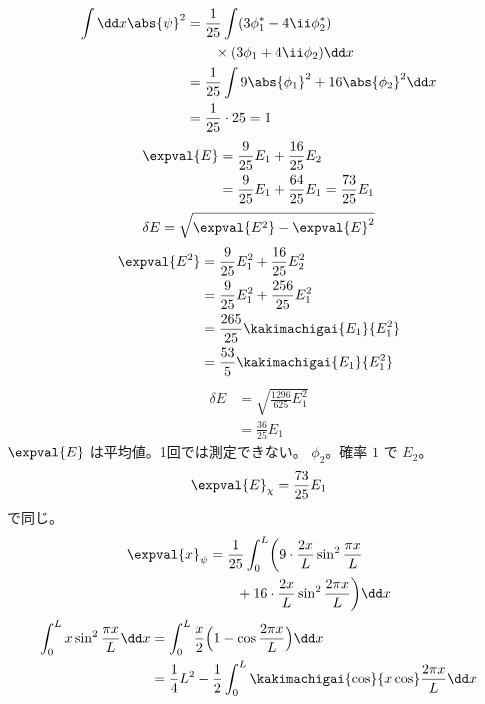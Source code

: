 \begin{align*}
\int\dd x\abs{\psi}^{2}&=\frac{1}{25}\int(3\phi_{1}^{*}-4\ii\phi_{2}^{*})\\
&\qquad\times(3\phi_{1}+4\ii\phi_{2})\dd x\\
&=\frac{1}{25}\int 9\abs{\phi_{1}}^{2}+16\abs{\phi_{2}}^{2}\dd x\\
&=\frac{1}{25}\cdot 25=1
\end{align*}
\begin{align*}
\expval{E}&=\frac{9}{25}E_{1}+\frac{16}{25}E_{2}\\
&=\frac{9}{25}E_{1}+\frac{64}{25}E_{1}=\frac{73}{25}E_{1}
\end{align*}
\[ \delta E=\sqrt{\expval{E^{2}}-\expval{E}^{2}} \]
\begin{align*}
\expval{E^{2}}&=\frac{9}{25}E_{1}^{2}+\frac{16}{25}E_{2}^{2}\\
&=\frac{9}{25}E_{1}^{2}+\frac{256}{25}E_{1}^{2}\\
&=\frac{265}{25}\kakimachigai{E_{1}}{E_{1}^{2}}\\
&=\frac{53}{5}\kakimachigai{E_{1}}{E_{1}^{2}}
\end{align*}
\begin{align*}
\delta E&=\sqrt{\frac{1296}{625}E_{1}^{2}}\\
&=\frac{36}{25}E_{1}
\end{align*}
$\expval{E}$ は平均値。1回では測定できない。
$\phi_{2}$。確率 $1$ で $E_{2}$。
\[ \expval{E}_{\chi}=\frac{73}{25}E_{1} \]
で同じ。
\begin{align*}
\expval{x}_{\psi}&=\frac{1}{25}\int_{0}^{L}\biggl(9\cdot\frac{2x}{L}\sin^{2}\frac{\pi x}{L}\\
&\qquad+16\cdot\frac{2x}{L}\sin^{2}\frac{2\pi x}{L}\biggr)\dd x
\end{align*}
\begin{align*}
\int_{0}^{L}x\sin^{2}\frac{\pi x}{L}\dd x&=\int_{0}^{L}\frac{x}{2}\Bigl(1-\cos\frac{2\pi x}{L}\Bigr)\dd x\\
&=\frac{1}{4}L^{2}-\frac{1}{2}\int_{0}^{L}\kakimachigai{\cos}{x\cos}\frac{2\pi x}{L}\dd x
\end{align*}
